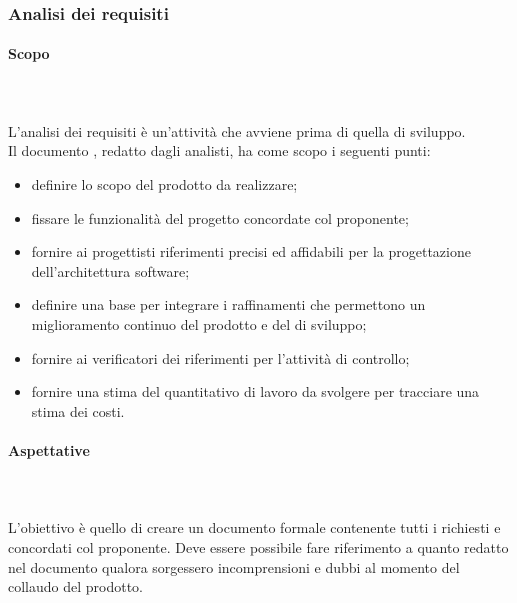 \subsubsection{Analisi dei requisiti}
\paragraph{Scopo}\mbox{}\\ \\
L'analisi dei requisiti è un'attività che avviene prima di quella di sviluppo.\\
Il documento \AdR{}, redatto dagli analisti, ha come scopo i seguenti punti:
\begin{itemize}
\item definire lo scopo del prodotto da realizzare;
\item fissare le funzionalità del progetto concordate col proponente;
\item fornire ai progettisti riferimenti precisi ed affidabili per la progettazione dell'architettura software;
\item definire una base per integrare i raffinamenti che permettono un miglioramento continuo del prodotto e del  di sviluppo;
\item fornire ai verificatori dei riferimenti per l’attività di controllo;
\item fornire una stima del quantitativo di lavoro da svolgere per tracciare una stima dei costi. 
\end{itemize}

\paragraph{Aspettative}\mbox{}\\ \\
L'obiettivo è quello di creare un documento formale contenente tutti i  richiesti e concordati col proponente.
Deve essere possibile fare riferimento a quanto redatto nel documento \AdR{} qualora sorgessero incomprensioni e dubbi al momento del collaudo del prodotto.

